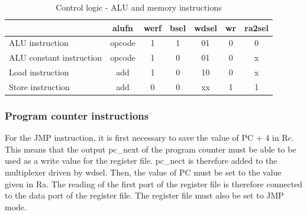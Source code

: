 \begin{table}[H]
    \centering
    \begin{tabular}{|l|c|c|c|c|c|c|}
    \hline
    \rowcolor[HTML]{DAE8FC} 
    \multicolumn{1}{|c|}{\cellcolor[HTML]{DAE8FC}\textbf{Instruction}} & \textbf{alufn} & \textbf{werf} & \textbf{bsel} & \multicolumn{1}{l|}{\cellcolor[HTML]{DAE8FC}\textbf{wdsel}} & \multicolumn{1}{l|}{\cellcolor[HTML]{DAE8FC}\textbf{wr}} & \multicolumn{1}{l|}{\cellcolor[HTML]{DAE8FC}\textbf{ra2sel}} \\ \hline
    ALU instruction                                                    & opcode         & 1             & 1             & 01                                                          & 0                                                        & 0                                                            \\ \hline
    ALU constant instruction                                           & opcode         & 1             & 0             & 01                                                          & 0                                                        & x                                                            \\ \hline
    Load instruction                                                   & add            & 1             & 0             & 10                                                          & 0                                                        & x                                                            \\ \hline
    Store instruction                                                  & add            & 0             & 0             & xx                                                          & 1                                                        & 1                                                            \\ \hline
    \end{tabular}
    \caption{Control logic - ALU and memory instructions}
    \label{tab:cl/dm}
\end{table}

\subsubsection*{Program counter instructions}

For the JMP instruction, it is first necessary to save the value of PC + 4 in Rc. This means that 
the output pc\_next of the program counter must be able to be used as a write value for the register 
file. pc\_nect is therefore added to the multiplexer driven by wdsel. Then, the value of PC must be 
set to the value given in Ra. The reading of the first port of the register file is therefore 
connected to the data port of the register file. The register file must also be set to JMP mode.

